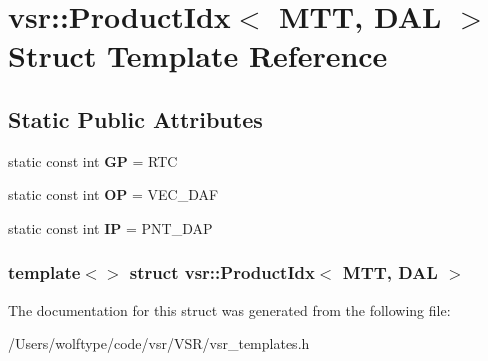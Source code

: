 \hypertarget{structvsr_1_1_product_idx_3_01_m_t_t_00_01_d_a_l_01_4}{\section{vsr\-:\-:Product\-Idx$<$ M\-T\-T, D\-A\-L $>$ Struct Template Reference}
\label{structvsr_1_1_product_idx_3_01_m_t_t_00_01_d_a_l_01_4}
}
\subsection*{Static Public Attributes}
\begin{DoxyCompactItemize}
\item 
\hypertarget{structvsr_1_1_product_idx_3_01_m_t_t_00_01_d_a_l_01_4_a840bf8dc7168cc15f818bb1012efad5d}{static const int {\bfseries G\-P} = R\-T\-C}\label{structvsr_1_1_product_idx_3_01_m_t_t_00_01_d_a_l_01_4_a840bf8dc7168cc15f818bb1012efad5d}

\item 
\hypertarget{structvsr_1_1_product_idx_3_01_m_t_t_00_01_d_a_l_01_4_a92392486fe75c51c49ec38e062092ebd}{static const int {\bfseries O\-P} = V\-E\-C\-\_\-\-D\-A\-F}\label{structvsr_1_1_product_idx_3_01_m_t_t_00_01_d_a_l_01_4_a92392486fe75c51c49ec38e062092ebd}

\item 
\hypertarget{structvsr_1_1_product_idx_3_01_m_t_t_00_01_d_a_l_01_4_a9896611095fdaa143e0a421b3d6b0ce6}{static const int {\bfseries I\-P} = P\-N\-T\-\_\-\-D\-A\-P}\label{structvsr_1_1_product_idx_3_01_m_t_t_00_01_d_a_l_01_4_a9896611095fdaa143e0a421b3d6b0ce6}

\end{DoxyCompactItemize}
\subsubsection*{template$<$$>$ struct vsr\-::\-Product\-Idx$<$ M\-T\-T, D\-A\-L $>$}



The documentation for this struct was generated from the following file\-:\begin{DoxyCompactItemize}
\item 
/\-Users/wolftype/code/vsr/\-V\-S\-R/vsr\-\_\-templates.\-h\end{DoxyCompactItemize}
